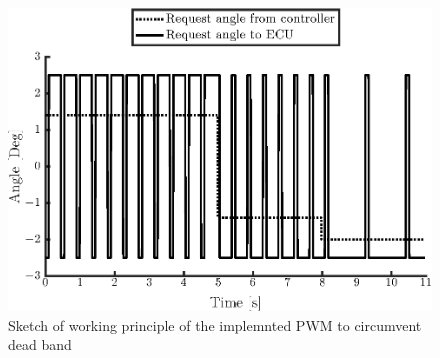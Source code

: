 \documentclass[root.tex]{subfiles}
\begin{document}
	
	\begin{figure}[h!]
		\centering
		\includegraphics[width=1\linewidth]{Deadband}
		\caption[Sketch of working princiiple of the implemnted PWM to circumvent dead band]{Sketch of working principle of the implemnted PWM to circumvent dead band}
		\label{fig:Deadband}
	\end{figure}
\end{document}
